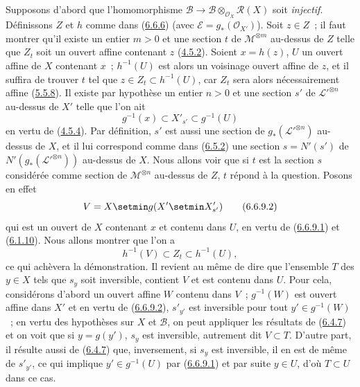 Supposons d'abord que l'homomorphisme
$\mathcal{B}\to
\mathcal{B}\otimes_{\mathcal{O}_X}\mathcal{R}(X)$ soit \emph{injectif}.
Définissons $Z$ et $h$ comme dans (\hyperref[II.6.6.6-fr]{6.6.6}) (avec
$\mathcal{E}=g_*(\mathcal{O}_{X'})$). Soit $z\in Z$~; il faut montrer qu'il
existe un entier $m>0$ et une section $t$ de $\mathcal{M}^{\otimes m}$
au-dessus de $Z$ telle que $Z_t$ soit un ouvert affine contenant $z$
(\hyperref[II.4.5.2-fr]{4.5.2}). Soient $x=h(z)$, $U$ un ouvert affine de
$X$ contenant $x$~; $h^{-1}(U)$ est alors un voisinage ouvert affine de $z$,
et il suffira de trouver $t$ tel que $z\in Z_t\subset h^{-1}(U)$, car $Z_t$
sera alors nécessairement affine (\hyperref[II.5.5.8-fr]{5.5.8}). Il existe
par hypothèse un entier $n>0$ et une section $s'$ de
${\mathcal{L}'}^{\otimes n}$ au-dessus de $X'$ telle que l'on ait
\[
\label{II.6.6.9.1-fr}
g^{-1}(x)\subset X'_{s'}\subset g^{-1}(U)
\tag{6.6.9.1}
\]
en vertu de (\hyperref[II.4.5.4-fr]{4.5.4}). Par définition, $s'$ est aussi
une section de $g_*({\mathcal{L}'}^{\otimes n})$ au-dessus de $X$, et il lui
correspond comme dans (\hyperref[II.6.5.2-fr]{6.5.2}) une section
$s=N'(s')$ de $N'(g_*({\mathcal{L}'}^{\otimes n}))$ au-dessus
de $X$. Nous allons voir que si $t$ est la section $s$ considérée comme
section de $\mathcal{M}^{\otimes n}$ au-dessus de $Z$, $t$ répond à la
question. Posons en effet
\[
\label{II.6.6.9.2-fr}
V=X\setmin g(X'\setmin X'_{s'})
\tag{6.6.9.2}
\]
qui est un ouvert de $X$ contenant $x$ et contenu dans $U$, en vertu de
(\hyperref[II.6.6.9.1-fr]{6.6.9.1}) et
(\hyperref[II.6.1.10-fr]{6.1.10}). Nous allons montrer que l'on a
\[
\label{II.6.6.9.3-fr}
h^{-1}(V)\subset Z_t\subset h^{-1}(U),
\tag{6.6.9.3}
\]
ce qui achèvera la démonstration. Il revient au même de dire que l'ensemble
$T$ des $y\in X$ tels que $s_y$ soit inversible, contient $V$ et est contenu
dans $U$. Pour cela, considérons d'abord un ouvert affine $W$ contenu dans
$V$~; $g^{-1}(W)$ est ouvert affine dans $X'$ et en vertu de
(\hyperref[II.6.6.9.2-fr]{6.6.9.2}), $s'_{y'}$ est inversible pour tout
$y'\in g^{-1}(W)$~; en vertu des hypothèses sur $X$ et $\mathcal{B}$, on
peut appliquer les résultats de (\hyperref[II.6.4.7-fr]{6.4.7}) et on voit
que si $y=g(y')$, $s_y$ est inversible, autrement dit $V\subset T$. D'autre
part, il résulte aussi de (\hyperref[II.6.4.7-fr]{6.4.7}) que, inversement,
si $s_y$ est inversible, il en est de même de $s'_{y'}$, ce qui implique
$y'\in g^{-1}(U)$ par (\hyperref[II.6.6.9.1-fr]{6.6.9.1}) et par suite
$y\in U$, d'où $T\subset U$ dans ce cas.

